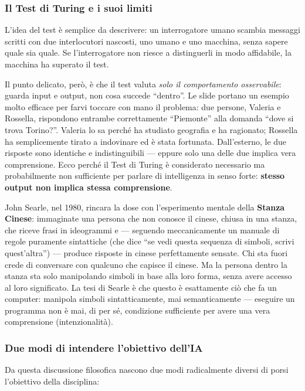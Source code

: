 \documentclass[11pt,a4paper]{article}
\begin{document}
\subsubsection{Il Test di Turing e i suoi limiti}

L'idea del test è semplice da descrivere: un interrogatore umano scambia messaggi scritti con due interlocutori nascosti, uno umano e uno macchina, senza sapere quale sia quale. Se l'interrogatore non riesce a distinguerli in modo affidabile, la macchina ha superato il test.

Il punto delicato, però, è che il test valuta \emph{solo il comportamento osservabile}: guarda input e output, non cosa succede ``dentro''. Le slide portano un esempio molto efficace per farvi toccare con mano il problema: due persone, Valeria e Rossella, rispondono entrambe correttamente ``Piemonte'' alla domanda ``dove si trova Torino?''. Valeria lo sa perché ha studiato geografia e ha ragionato; Rossella ha semplicemente tirato a indovinare ed è stata fortunata. Dall'esterno, le due risposte sono identiche e indistinguibili --- eppure solo una delle due implica vera comprensione. Ecco perché il Test di Turing è considerato necessario ma probabilmente non sufficiente per parlare di intelligenza in senso forte: \textbf{stesso output non implica stessa comprensione}.

John Searle, nel 1980, rincara la dose con l'esperimento mentale della \textbf{Stanza Cinese}: immaginate una persona che non conosce il cinese, chiusa in una stanza, che riceve frasi in ideogrammi e --- seguendo meccanicamente un manuale di regole puramente sintattiche (che dice ``se vedi questa sequenza di simboli, scrivi quest'altra'') --- produce risposte in cinese perfettamente sensate. Chi sta fuori crede di conversare con qualcuno che capisce il cinese. Ma la persona dentro la stanza sta solo manipolando simboli in base alla loro forma, senza avere accesso al loro significato. La tesi di Searle è che questo è esattamente ciò che fa un computer: manipola simboli sintatticamente, mai semanticamente --- eseguire un programma non è mai, di per sé, condizione sufficiente per avere una vera comprensione (intenzionalità).

\subsubsection{Due modi di intendere l'obiettivo dell'IA}

Da questa discussione filosofica nascono due modi radicalmente diversi di porsi l'obiettivo della disciplina:
\end{document}
